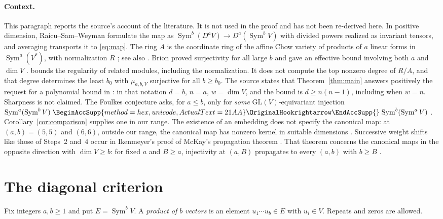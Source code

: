 \documentclass[11pt]{article}
\renewcommand{\hookrightarrow}{\mathrel{
  \BeginAccSupp{method=hex,unicode,ActualText=21AA}
  \OriginalHookrightarrow\EndAccSupp{}}}
\theoremstyle{remark}
\DeclareMathOperator{\Sym}{Sym}
\begin{document}
\paragraph{Context.}
This paragraph reports the source's account of the literature. It is not
used in the proof and has not been re-derived here. In positive dimension,
Raicu--Sam--Weyman \cite[Section~2]{RSW} formulate the map as
$\Sym^b(D^aV)\to D^a(\Sym^bV)$ with divided powers realized as invariant
tensors, and averaging transports it to \eqref{eq:map}. The ring $A$ is the
coordinate ring of the affine Chow variety of products of $a$ linear forms
in $\Sym^a(V^*)$, with normalization $R$
\cite[Section~2, Theorem~2.3]{RSW}; see also
\cite[Section~7.6, Propositions~7.11--7.12]{Landsberg}. Brion proved
surjectivity for all large $b$ \cite{Brion1993} and gave an effective bound
involving both $a$ and $\dim V$ \cite[Theorem~3.3]{Brion}.
\cite[Theorem~3.9]{RSW} bounds the regularity of related modules, including
the normalization. It does not compute the top nonzero degree of $R/A$, and
that degree determines the least $b_0$ with $\mu_{a,b,V}$ surjective for all
$b\ge b_0$. The source states that Theorem~\ref{thm:main} answers positively the request
for a polynomial bound in \cite[Problem~7.19]{Landsberg}: in that notation
$d=b$, $n=a$, $w=\dim V$, and the bound is $d\ge n(n-1)$, including when
$w=n$. Sharpness is not claimed. The Foulkes conjecture
\cite{Foulkes1950} asks, for $a\le b$, only for \emph{some}
$\mathrm{GL}(V)$-equivariant injection
$\Sym^a(\Sym^b V)\hookrightarrow\Sym^b(\Sym^a V)$
\cite[Conjecture~2.10]{RSW}. Corollary~\ref{cor:comparison} supplies one in
our range. The existence of an embedding does not specify the canonical
map: at $(a,b)=(5,5)$ and $(6,6)$, outside our range, the canonical map has
nonzero kernel in suitable dimensions
\cite[arXiv version, Theorem~6(b),(c) and Remark~7]{CIM}. Successive weight
shifts like those of Steps~2 and~4 occur in Ikenmeyer's proof
\cite[Section~5]{Ikenmeyer} of McKay's propagation theorem \cite{McKay}.
That theorem concerns the canonical maps in the opposite direction with
$\dim V\ge b$: for fixed $a$ and $B\ge a$, injectivity at $(a,B)$
propagates to every $(a,b)$ with $b\ge B$
\cite[Theorem~1.3 and Section~3]{Ikenmeyer}.

\section{The diagonal criterion}\label{sec:map}

Fix integers $a,b\ge1$ and put $E=\Sym^bV$. A \emph{product of $b$ vectors}
is an element $u_1\cdots u_b\in E$ with $u_i\in V$. Repeats and zeros are
allowed.
\end{document}

